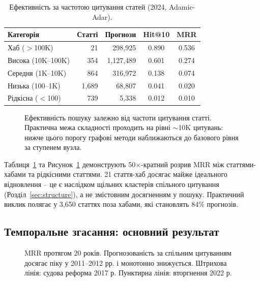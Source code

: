 \documentclass[11pt]{article}
\begin{document}
\begin{table}[t]
\centering
\small
\caption{Ефективність за частотою цитування статей (2024, Adamic-Adar).}
\label{tab:difficulty}
\begin{tabular}{@{}l r r cc@{}}
\toprule
\textbf{Категорія} & \textbf{Статті} & \textbf{Прогнози} & \textbf{Hit@10} & \textbf{MRR} \\
\midrule
Хаб ($>$100K)     &    21 &  298{,}925 & 0.890 & 0.536 \\
Висока (10K--100K)  &   354 & 1{,}127{,}489 & 0.601 & 0.274 \\
Середня (1K--10K)     &   864 &  316{,}972 & 0.138 & 0.074 \\
Низька (100--1K)     & 1{,}689 &   68{,}807 & 0.041 & 0.020 \\
Рідкісна ($<$100)     &   739 &    5{,}338 & 0.012 & 0.010 \\
\bottomrule
\end{tabular}
\end{table}

\begin{figure}[t]
\centering

\caption{Ефективність пошуку залежно від частоти цитування статті. Практична межа складності проходить на рівні $\sim$10K цитувань: нижче цього порогу графові методи наближаються до базового рівня за ступенем вузла.}
\label{fig:difficulty}
\end{figure}

Таблиця~\ref{tab:difficulty} та Рисунок~\ref{fig:difficulty} демонструють 50$\times$-кратний розрив MRR між статтями-хабами та рідкісними статтями.
21 стаття-хаб досягає майже ідеального відновлення -- це є наслідком щільних кластерів спільного цитування (Розділ~\ref{sec:structure}), а не змістовним досягненням у пошуку.
Практичний виклик полягає у 3{,}650 статтях поза хабами, які становлять 84\% прогнозів.

\subsection{Темпоральне згасання: основний результат}

\begin{figure}[t]
\centering

\caption{MRR протягом 20 років. Прогнозованість за спільним цитуванням досягає піку у 2011--2012 рр. і монотонно знижується. Штрихова лінія: судова реформа 2017 р. Пунктирна лінія: вторгнення 2022 р.}
\label{fig:temporal}
\end{figure}
\end{document}
